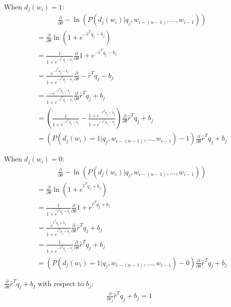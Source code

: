 When $d_j(w_i)  = 1$:
\begin{align*}
& \frac{\partial}{\partial \theta} -\ln(P(d_j(w_i) | q_j, w_{i-(n-1)},\dots, w_{i-1})) 
\end{align*}
\begin{align*}
&=  \frac{\partial}{\partial \theta} \ln (1 + e^{-\hat{r}^T q_{j} -b_{j}})
\\
&= \frac{1}{1 + e^{-\hat{r}^T q_{j} -b_{j}}} \frac{\partial}{\partial \theta}1 + e^{-\hat{r}^T q_{j} -b_{j}}
\\
&= \frac{e^{-\hat{r}^T q_{j} -b_{j}}}{1 + e^{-\hat{r}^T q_{j} -b_{j}}} \frac{\partial}{\partial \theta}-\hat{r}^T q_{j} -b_{j}
\\
&= \frac{-e^{-\hat{r}^T q_{j} -b_{j}}}{1 + e^{-\hat{r}^T q_{j} -b_{j}}} \frac{\partial}{\partial \theta}\hat{r}^T q_{j} +b_{j}
\\
&= \left( \frac{1}{1 + e^{-\hat{r}^T q_{j} -b_{j}}}  - \frac{1 + e^{-\hat{r}^T q_{j} -b_{j}}}{1 + e^{-\hat{r}^T q_{j} -b_{j}}} \right) \frac{\partial}{\partial \theta}\hat{r}^T q_{j} +b_{j}
\\
&= \left( P(d_j(w_i)=1 | q_j, w_{i-(n-1)},\dots, w_{i-1}) - 1 \right) \frac{\partial}{\partial \theta}\hat{r}^T q_{j} +b_{j}
\end{align*}

When $d_j(w_i)  = 0$:
\begin{align*}
& \frac{\partial}{\partial \theta} -\ln(P(d_j(w_i) | q_j, w_{i-(n-1)},\dots, w_{i-1})) 
\end{align*}
\begin{align*}
&=  \frac{\partial}{\partial \theta} \ln (1 + e^{\hat{r}^T q_{j} +b_{j}})
\\
&= \frac{1}{1 + e^{\hat{r}^T q_{j} +b_{j}}} \frac{\partial}{\partial \theta}1 + e^{\hat{r}^T q_{j} +b_{j}}
\\
&= \frac{e^{\hat{r}^T q_{j} +b_{j}}}{1 + e^{\hat{r}^T q_{j} +b_{j}}} \frac{\partial}{\partial \theta}\hat{r}^T q_{j} +b_{j}
\\
&= \frac{1}{1 + e^{-\hat{r}^T q_{j} -b_{j}}}  \frac{\partial}{\partial \theta}\hat{r}^T q_{j} +b_{j}
\\
&= \left( P(d_j(w_i)=1 | q_j, w_{i-(n-1)},\dots, w_{i-1}) - 0 \right) \frac{\partial}{\partial \theta}\hat{r}^T q_{j} +b_{j}
\end{align*}

$\frac{\partial}{\partial \theta}\hat{r}^T q_{j} +b_{j}$ with respect to $b_j$:
\begin{align*}
\frac{\partial}{\partial r_j}\hat{r}^T q_{j} +b_{j} = 1
\end{align*}

